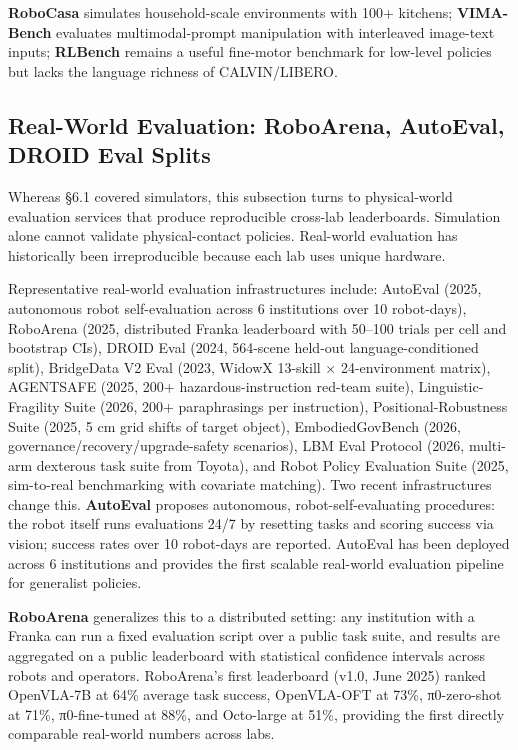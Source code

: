 \documentclass{article}
\begin{document}
\textbf{RoboCasa} simulates household-scale environments with 100+ kitchens; \textbf{VIMA-Bench} evaluates multimodal-prompt manipulation with interleaved image-text inputs; \textbf{RLBench} remains a useful fine-motor benchmark for low-level policies but lacks the language richness of CALVIN/LIBERO.

\subsection{Real-World Evaluation: RoboArena, AutoEval, DROID Eval Splits}\label{real-world-evaluation-roboarena-autoeval-droid-eval-splits}

Whereas §6.1 covered simulators, this subsection turns to physical-world evaluation services that produce reproducible cross-lab leaderboards. Simulation alone cannot validate physical-contact policies. Real-world evaluation has historically been irreproducible because each lab uses unique hardware.

Representative real-world evaluation infrastructures include: AutoEval (2025, autonomous robot self-evaluation across 6 institutions over 10 robot-days), RoboArena (2025, distributed Franka leaderboard with 50--100 trials per cell and bootstrap CIs), DROID Eval (2024, 564-scene held-out language-conditioned split), BridgeData V2 Eval (2023, WidowX 13-skill × 24-environment matrix), AGENTSAFE (2025, 200+ hazardous-instruction red-team suite), Linguistic-Fragility Suite (2026, 200+ paraphrasings per instruction), Positional-Robustness Suite (2025, 5 cm grid shifts of target object), EmbodiedGovBench (2026, governance/recovery/upgrade-safety scenarios), LBM Eval Protocol (2026, multi-arm dexterous task suite from Toyota), and Robot Policy Evaluation Suite (2025, sim-to-real benchmarking with covariate matching). Two recent infrastructures change this. \textbf{AutoEval} \cite{zhou2025autoevalautonomous} proposes autonomous, robot-self-evaluating procedures: the robot itself runs evaluations 24/7 by resetting tasks and scoring success via vision; success rates over 10 robot-days are reported. AutoEval has been deployed across 6 institutions and provides the first scalable real-world evaluation pipeline for generalist policies.

\textbf{RoboArena} \cite{atreya2025roboarenadistribut} generalizes this to a distributed setting: any institution with a Franka can run a fixed evaluation script over a public task suite, and results are aggregated on a public leaderboard with statistical confidence intervals across robots and operators. RoboArena's first leaderboard (v1.0, June 2025) ranked OpenVLA-7B at 64\% average task success, OpenVLA-OFT at 73\%, π0-zero-shot at 71\%, π0-fine-tuned at 88\%, and Octo-large at 51\%, providing the first directly comparable real-world numbers across labs.
\end{document}
